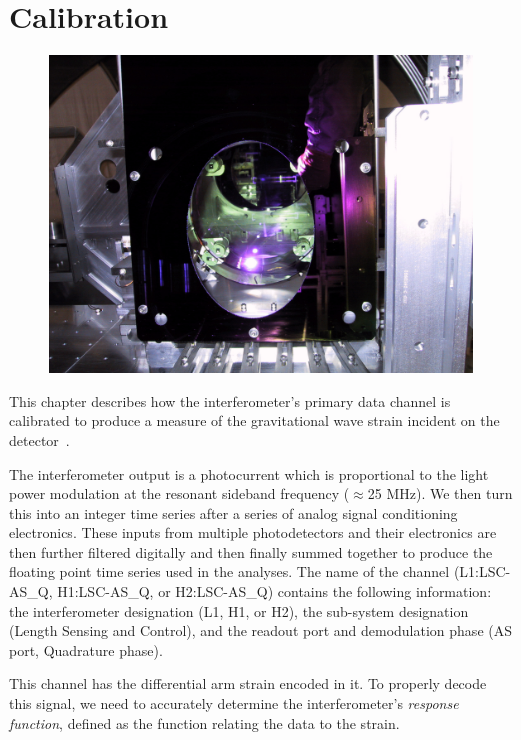 \chapter{Calibration}
\label{chap:cal}

\begin{figure}[!h]
\centerline{\includegraphics[angle=0,width=6.5in]{Figures/Chap6/RMfuckup.jpg}}
\end{figure}
\clearpage

This chapter describes how the interferometer's primary data channel is calibrated
to produce a measure of the gravitational wave strain incident on the 
detector~\cite{S1:Calibration,S2:Calibration}.

The interferometer output is a photocurrent which is proportional to the light power
modulation at the resonant sideband frequency ($\approx$25 MHz). We then turn this
into an integer time series after a series of analog signal conditioning
electronics. These inputs from multiple photodetectors and their electronics are
then further filtered digitally and then finally summed together to produce the
floating point time series used in the analyses. The name of the channel 
(L1:LSC-AS\_Q, H1:LSC-AS\_Q, or H2:LSC-AS\_Q) contains the following information:
the interferometer designation (L1, H1, or H2), the sub-system designation (Length
Sensing and Control), and the readout port and demodulation phase (AS port,
Quadrature phase).

This channel has the differential arm strain encoded in it. To properly decode 
this signal, 
we need to accurately determine the interferometer's \emph{response function}, 
defined as the function relating the data to the strain.


